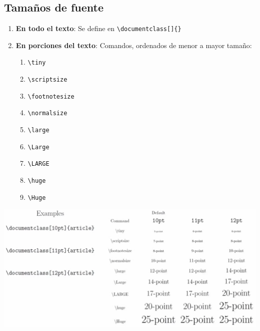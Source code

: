 \documentclass[../notes.tex]{subfiles}
\begin{document}
    \subsection{Tamaños de fuente}
        \begin{enumerate}
            \item \textbf{En todo el texto}: Se define en \texttt{\textbackslash documentclass[]\{\}}

            \item \textbf{En porciones del texto}:
                Comandos, ordenados de menor a mayor tamaño:
                \begin{enumerate}
                    \item \texttt{\textbackslash tiny}
                    \item \texttt{\textbackslash scriptsize}
                    \item \texttt{\textbackslash footnotesize}
                    \item \texttt{\textbackslash normalsize}
                    \item \texttt{\textbackslash large}
                    \item \texttt{\textbackslash Large}
                    \item \texttt{\textbackslash LARGE}
                    \item \texttt{\textbackslash huge}
                    \item \texttt{\textbackslash Huge}
                \end{enumerate}
                
        \end{enumerate}
        
        \begin{center}
            \includegraphics[scale=0.25]{sizes}
        \end{center}
    
\end{document}
